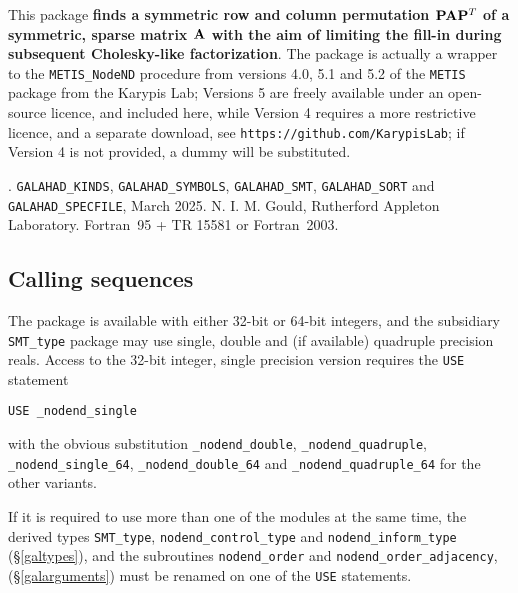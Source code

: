 \documentclass{galahad}
\newcommand{\packagename}{nodend}
\newcommand{\fullpackagename}{\libraryname\_\-\packagename}
\begin{document}
\galheader


\galsummary

This package
{\bf finds a symmetric row and column permutation ${\mathbf{P}} {\mathbf{A}} {\mathbf{P}}^T$ 
of a symmetric, sparse matrix ${\mathbf{A}}$ with the aim of limiting 
the fill-in during subsequent Cholesky-like factorization}. 
The package is actually a wrapper to the {\tt METIS\_NodeND} 
procedure from versions 4.0, 5.1 and 5.2 of the
{\tt METIS} package from the Karypis Lab; Versions 5 are freely 
available under an open-source licence, and included here, 
while Version 4 requires a more restrictive licence, and a separate download, 
see {\tt https://github.com/KarypisLab}; if Version 4 is not provided,
a dummy will be substituted.


\galattributes
\galversions{\tt  \fullpackagename\_single, \fullpackagename\_double}.
\galcalls
{\tt GALAHAD\-\_KINDS},
{\tt GAL\-AHAD\-\_SYMBOLS},
{\tt GALAHAD\_SMT},
{\tt GALAHAD\_\-SORT}
and 
{\tt GALAHAD\_SPECFILE},
\galdate March 2025.
\galorigin N. I. M. Gould, Rutherford Appleton Laboratory.
\gallanguage Fortran~95 + TR 15581 or Fortran~2003.


\galhowto

\subsection{Calling sequences}

The package is available with either 32-bit or 64-bit integers, 
and the subsidiary {\tt SMT\_type} package may use
single, double and (if available) quadruple precision reals.
Access to the 32-bit integer,
single precision version requires the {\tt USE} statement
\medskip

\hspace{8mm} {\tt USE \fullpackagename\_single}

\medskip
\noindent
with the obvious substitution 
{\tt \fullpackagename\_double},
{\tt \fullpackagename\_quadruple},
{\tt \fullpackagename\_single\_64},
{\tt \fullpackagename\_double\_64} and
{\tt \fullpackagename\_quadruple\_64} for the other variants.

\noindent
If it is required to use more than one of the modules at the same time, 
the derived types
{\tt SMT\_type},
{\tt \packagename\_control\_type}
and
{\tt \packagename\_inform\_type}
(\S\ref{galtypes}),
and the subroutines
{\tt \packagename\-\_order}
and
{\tt \packagename\-\_order\_adjacency},
(\S\ref{galarguments})
must be renamed on one of the {\tt USE} statements.
\end{document}
